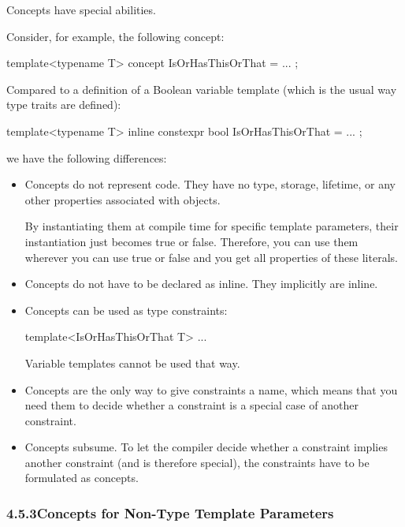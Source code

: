 Concepts have special abilities.

Consider, for example, the following concept:

\begin{cpp}
template<typename T>
concept IsOrHasThisOrThat = ... ;
\end{cpp}

Compared to a definition of a Boolean variable template (which is the usual way type traits are defined):

\begin{cpp}
template<typename T>
inline constexpr bool IsOrHasThisOrThat = ... ;
\end{cpp}

we have the following differences:

\begin{itemize}
\item
Concepts do not represent code. They have no type, storage, lifetime, or any other properties associated with objects.

By instantiating them at compile time for specific template parameters, their instantiation just becomes true or false. Therefore, you can use them wherever you can use true or false and you get all properties of these literals.

\item
Concepts do not have to be declared as inline. They implicitly are inline.

\item
Concepts can be used as type constraints:

\begin{cpp}
template<IsOrHasThisOrThat T>
...
\end{cpp}

Variable templates cannot be used that way.

\item
Concepts are the only way to give constraints a name, which means that you need them to decide whether a constraint is a special case of another constraint.

\item
Concepts subsume. To let the compiler decide whether a constraint implies another constraint (and is therefore special), the constraints have to be formulated as concepts.
\end{itemize}

\subsubsection*{ 4.5.3\hspace{0.2cm}Concepts for Non-Type Template Parameters}

